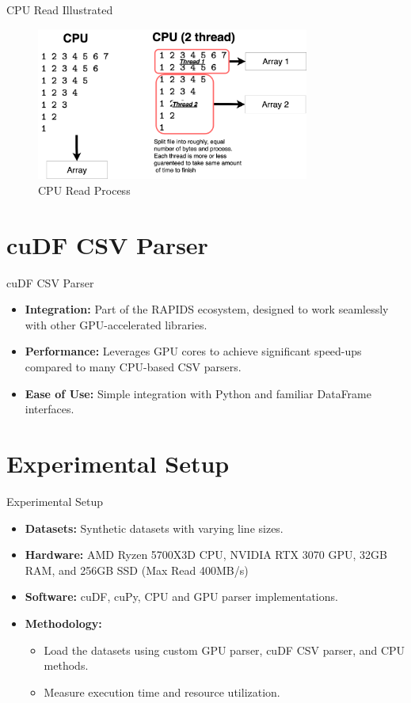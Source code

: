 \documentclass{beamer}
\begin{document}
\begin{frame}{CPU Read Illustrated}
  \begin{figure}
    \centering
    \includegraphics[width=0.8\textwidth]{1.png}
    \caption{CPU Read Process}
    \label{fig:cpu_read}
  \end{figure}
\end{frame}


\section{cuDF CSV Parser}
\begin{frame}{cuDF CSV Parser}
  \begin{itemize}
    \item \textbf{Integration:} Part of the RAPIDS ecosystem, designed to work seamlessly with other GPU-accelerated libraries.
    \item \textbf{Performance:} Leverages GPU cores to achieve significant speed-ups compared to many CPU-based CSV parsers.
    \item \textbf{Ease of Use:} Simple integration with Python and familiar DataFrame interfaces.
  \end{itemize}
\end{frame}

\section{Experimental Setup}
\begin{frame}{Experimental Setup}

\begin{itemize}
  \item \textbf{Datasets:} Synthetic datasets with varying line sizes.
  \item \textbf{Hardware:} AMD Ryzen 5700X3D CPU, NVIDIA RTX 3070 GPU, 32GB RAM, and 256GB SSD (Max Read 400MB/s)
  \item \textbf{Software:} cuDF, cuPy, CPU and GPU parser implementations.
  \item \textbf{Methodology:}
    \begin{itemize}
      \item Load the datasets using custom GPU parser, cuDF CSV parser, and CPU methods.
      \item Measure execution time and resource utilization.
    \end{itemize}
\end{itemize}

\end{frame}
\end{document}
